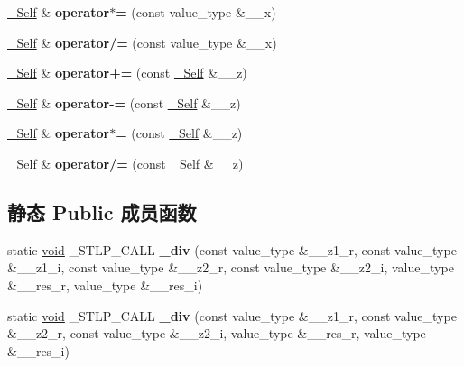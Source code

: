 \begin{DoxyCompactItemize}
\mbox{\label{structcomplex_afacee4beb7bc1aeea174d70d8da45527}} 
\hyperlink{structcomplex}{\+\_\+\+Self} \& {\bfseries operator$\ast$=} (const value\+\_\+type \&\+\_\+\+\_\+x)
\item 
\mbox{\label{structcomplex_a5adbe0afe5b2dd342e99977efec9f3e2}} 
\hyperlink{structcomplex}{\+\_\+\+Self} \& {\bfseries operator/=} (const value\+\_\+type \&\+\_\+\+\_\+x)
\item 
\mbox{\label{structcomplex_a8cbb81b9d415006fdcf55977e5788ec3}} 
\hyperlink{structcomplex}{\+\_\+\+Self} \& {\bfseries operator+=} (const \hyperlink{structcomplex}{\+\_\+\+Self} \&\+\_\+\+\_\+z)
\item 
\mbox{\label{structcomplex_a19466e770f8781baf776c219f949cc25}} 
\hyperlink{structcomplex}{\+\_\+\+Self} \& {\bfseries operator-\/=} (const \hyperlink{structcomplex}{\+\_\+\+Self} \&\+\_\+\+\_\+z)
\item 
\mbox{\label{structcomplex_abfd2f281d4a38ed665847e2104c03f0d}} 
\hyperlink{structcomplex}{\+\_\+\+Self} \& {\bfseries operator$\ast$=} (const \hyperlink{structcomplex}{\+\_\+\+Self} \&\+\_\+\+\_\+z)
\item 
\mbox{\label{structcomplex_a420d7c5789e1ca8a76a4d977780ed2e6}} 
\hyperlink{structcomplex}{\+\_\+\+Self} \& {\bfseries operator/=} (const \hyperlink{structcomplex}{\+\_\+\+Self} \&\+\_\+\+\_\+z)
\end{DoxyCompactItemize}
\subsection*{静态 Public 成员函数}
\begin{DoxyCompactItemize}
\item 
\mbox{\label{structcomplex_ad0ec75845de8b3f43a91c7091b3897b2}} 
static \hyperlink{interfacevoid}{void} \+\_\+\+S\+T\+L\+P\+\_\+\+C\+A\+LL {\bfseries \+\_\+div} (const value\+\_\+type \&\+\_\+\+\_\+z1\+\_\+r, const value\+\_\+type \&\+\_\+\+\_\+z1\+\_\+i, const value\+\_\+type \&\+\_\+\+\_\+z2\+\_\+r, const value\+\_\+type \&\+\_\+\+\_\+z2\+\_\+i, value\+\_\+type \&\+\_\+\+\_\+res\+\_\+r, value\+\_\+type \&\+\_\+\+\_\+res\+\_\+i)
\item 
\mbox{\label{structcomplex_a20eaf6444aec4f38a58ceac4dbe49987}} 
static \hyperlink{interfacevoid}{void} \+\_\+\+S\+T\+L\+P\+\_\+\+C\+A\+LL {\bfseries \+\_\+div} (const value\+\_\+type \&\+\_\+\+\_\+z1\+\_\+r, const value\+\_\+type \&\+\_\+\+\_\+z2\+\_\+r, const value\+\_\+type \&\+\_\+\+\_\+z2\+\_\+i, value\+\_\+type \&\+\_\+\+\_\+res\+\_\+r, value\+\_\+type \&\+\_\+\+\_\+res\+\_\+i)
\end{DoxyCompactItemize}
